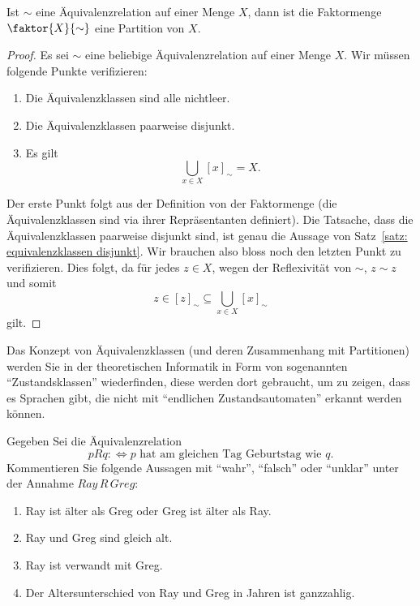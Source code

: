 \begin{satz}\label{satz: equivalenzklassen partition}
Ist $\sim$ eine Äquivalenzrelation auf einer Menge $X$, dann ist die Faktormenge $\faktor{X}{\sim}$ eine Partition von $X$.
\end{satz}
\begin{proof}
Es sei $\sim$ eine beliebige Äquivalenzrelation auf einer Menge $X$. Wir müssen folgende Punkte verifizieren:
\begin{enumerate}
\item\label{a} Die Äquivalenzklassen sind alle nichtleer.
\item\label{2} Die Äquivalenzklassen paarweise disjunkt.
\item\label{3} Es gilt
\[
\bigcup_{x\in X}[x]_{\sim}=X.
\]
\end{enumerate}
Der erste Punkt folgt aus der Definition von der Faktormenge (die Äquivalenzklassen sind via ihrer Repräsentanten definiert). Die Tatsache, dass die Äquivalenzklassen paarweise disjunkt sind, ist genau die Aussage von Satz~\ref{satz: equivalenzklassen disjunkt}. Wir brauchen also bloss noch den letzten Punkt zu verifizieren. Dies folgt, da für jedes $z\in X$, wegen der Reflexivität von $\sim$, $z\sim z$ und somit
\[
z\in[z]_\sim\subseteq\bigcup_{x\in X}[x]_\sim
\]
gilt.
\end{proof}

\begin{rk}
	Das Konzept von Äquivalenzklassen (und deren Zusammenhang mit Partitionen) werden Sie in der theoretischen Informatik in Form von sogenannten ``Zustandsklassen'' wiederfinden, diese werden dort gebraucht, um zu zeigen, dass es Sprachen gibt, die nicht mit ``endlichen Zustandsautomaten'' erkannt werden können.
\end{rk}

\begin{ueb}\label{greg}
	Gegeben Sei die Äquivalenzrelation
	\[
		pRq:\Leftrightarrow\text{$p$ hat am gleichen Tag Geburtstag wie $q$.}
	\]
	Kommentieren Sie folgende Aussagen mit ``wahr'', ``falsch'' oder ``unklar'' unter der
	Annahme $Ray\, R\, Greg $:
	\begin{enumerate}
		\item Ray ist älter als Greg oder Greg ist älter als Ray.
		\item Ray und Greg sind gleich alt.
		\item Ray ist verwandt mit Greg.
		\item Der Altersunterschied von Ray und Greg in Jahren ist ganzzahlig.
	\end{enumerate}
\end{ueb}
\begin{lsg}
		{~
			\answerspace{2cm}}
\end{lsg}

